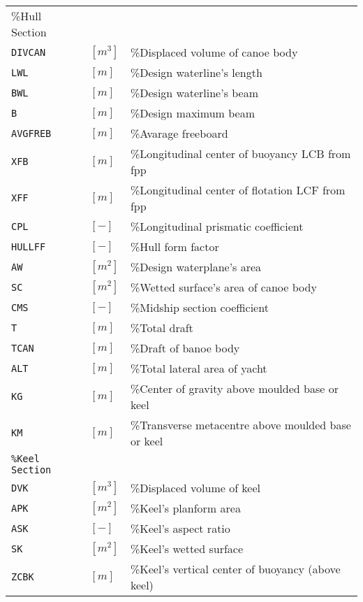 \documentclass[a4paper,openany]{memoir}
\begin{document}
\begin{table}[h]
  \centering
  \small{
  \begin{tabular}{lll}
    \%Hull Section\\
    \texttt{DIVCAN}			&${[m^3]}$ 		& \%Displaced volume of canoe body\\
    \texttt{LWL}			&${[m]}$ 		& \%Design waterline's length\\
    \texttt{BWL}			&${[m]}$ 		& \%Design waterline's beam\\
    \texttt{B}       		&${[m]}$ 		& \%Design maximum beam\\
    \texttt{AVGFREB}		&${[m]}$		& \%Avarage freeboard\\
    \texttt{XFB}     		&${[m]}$ 		& \%Longitudinal center of buoyancy LCB from fpp\\
    \texttt{XFF}     		&${[m]}$		& \%Longitudinal center of flotation LCF from fpp\\
    \texttt{CPL}     		&${[-]}$		&\%Longitudinal prismatic coefficient\\
    \texttt{HULLFF}  		&${[-]}$		&\%Hull form factor\\
    \texttt{AW}     		&${[m^2]}$		&\%Design waterplane's area\\
    \texttt{SC}      		&${[m^2]}$		&\%Wetted surface's area of canoe body\\
    \texttt{CMS}     		&${[-]}$		&\%Midship section coefficient\\
    \texttt{T}       		&${[m]}$		&\%Total draft\\
    \texttt{TCAN}    		&${[m]}$		&\%Draft of banoe body\\
    \texttt{ALT}     		&${[m]}$		&\%Total lateral area of yacht\\
    \texttt{KG}      		&${[m]}$		&\%Center of gravity above moulded base or keel\\
    \texttt{KM}      		&${[m]}$		&\%Transverse metacentre above moulded base or keel\\
    \texttt{\%Keel Section}\\
    \texttt{DVK}     		&${[m^3]}$		&\%Displaced volume of keel\\
    \texttt{APK}    		&${[m^2]}$		&\%Keel's planform area\\
    \texttt{ASK}    		&${[-]}$		&\%Keel's aspect ratio\\
    \texttt{SK}    	 		&${[m^2]}$		&\%Keel's wetted surface\\
    \texttt{ZCBK} 			&${[m]}$		&\%Keel's vertical center of buoyancy (above keel)\\

\end{tabular}}
\end{table}
\end{document}
